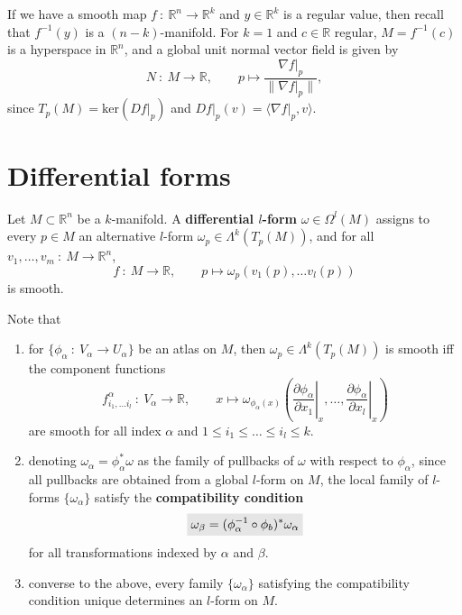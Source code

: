 \documentclass[letter-paper]{tufte-book}
\newcommand{\highlight}[1]{\mathchoice%
  {\colorbox{black!10}{$\displaystyle#1$}}%
  {\colorbox{black!10}{$\textstyle#1$}}%
  {\colorbox{black!10}{$\scriptstyle#1$}}%
  {\colorbox{black!10}{$\scriptscriptstyle#1$}}}%
\begin{document}
If we have a smooth map $f\ :\ \mathbb{R}^n \to \mathbb{R}^k$ and $y \in \mathbb{R}^k$ is a regular value, then recall that $f^{-1}(y)$ is a $(n-k)$-manifold. For $k=1$ and $c\in\mathbb{R}$ regular, $M = f^{-1}(c)$ is a hyperspace in $\mathbb{R}^n$, and a global unit normal vector field is given by
\begin{equation}
  N\ :\ M \to \mathbb{R}, \qquad p \mapsto \frac{\left.\nabla f\right|_p}{\|\left.\nabla f\right|_p\|},
\end{equation}
since $T_p(M) = \mbox{ker}(\left.Df\right|_p)$ and $\left.Df\right|_p(v) = \langle \left.\nabla f\right|_p, v\rangle$.


\section{Differential forms}

Let $M \subset \mathbb{R}^n$ be a $k$-manifold. A \textbf{differential $l$-form} $\omega \in \Omega^l(M)$ assigns to every $p \in M$ an alternative $l$-form $\omega_p \in \Lambda^k(T_p(M))$, and for all $v_1, \ldots, v_m\ :\ M \to \mathbb{R}^n$,
\begin{equation}
  f\ :\ M\to\mathbb{R}, \qquad p \mapsto \omega_p(v_1(p), \ldots v_l(p))
\end{equation}
is smooth.

Note that
\begin{enumerate}
  \item for $\{\phi_\alpha\ :\ V_\alpha \to U_\alpha\}$ be an atlas on $M$, then $\omega_p \in \Lambda^k(T_p(M))$ is smooth iff the component functions
  \begin{equation}
    f_{i_1, \ldots i_l}^\alpha\ :\ V_\alpha \to \mathbb{R}, \qquad x \mapsto \omega_{\phi_\alpha(x)}\left(\left.\frac{\partial \phi_\alpha}{\partial x_1}\right|_x, \ldots, \left.\frac{\partial \phi_\alpha}{\partial x_l}\right|_x\right)
  \end{equation}
  are smooth for all index $\alpha$ and $1 \leq i_1 \leq \ldots \leq i_l \leq k$.
  
  \item denoting $\omega_\alpha = \phi_\alpha^* \omega$ as the family of pullbacks of $\omega$ with respect to $\phi_\alpha$, since all pullbacks are obtained from a global $l$-form on $M$, the local family of $l$-forms $\{\omega_\alpha\}$ satisfy the \textbf{compatibility condition}
  \begin{equation}
    \highlight{\omega_\beta = (\phi_\alpha^{-1} \circ \phi_b)^* \omega_\alpha}
  \end{equation}
  for all transformations indexed by $\alpha$ and $\beta$.
  
  \item converse to the above, every family $\{\omega_\alpha\}$ satisfying the compatibility condition unique determines an $l$-form on $M$.
\end{enumerate}
\end{document}
